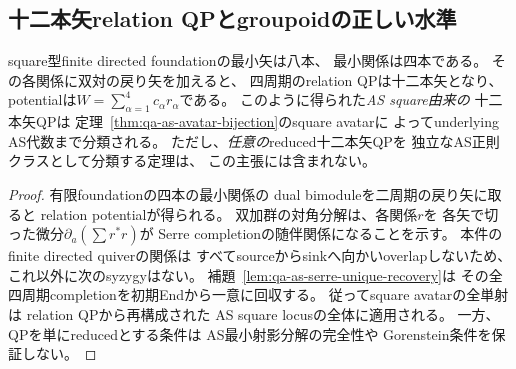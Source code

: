 \subsection{十二本矢relation QPとgroupoidの正しい水準}
\label{subsec:qa-as12-qp-status}

\begin{proposition}[十二本矢QPが表すもの]
\label{prop:qa-as12-relation-qp-status}
square型finite directed foundationの最小矢は八本、
最小関係は四本である。
その各関係に双対の戻り矢を加えると、
四周期のrelation QPは十二本矢となり、
potentialは$W=\sum_{\alpha=1}^4c_\alpha r_\alpha$である。
このように得られた\emph{AS square由来の}
十二本矢QPは
定理~\ref{thm:qa-as-avatar-bijection}のsquare avatarに
よってunderlying AS代数まで分類される。
ただし、\emph{任意の}reduced十二本矢QPを
独立なAS正則クラスとして分類する定理は、
この主張には含まれない。
\end{proposition}
\begin{proof}
有限foundationの四本の最小関係の
dual bimoduleを二周期の戻り矢に取ると
relation potentialが得られる。
双加群の対角分解は、各関係$r$を
各矢で切った微分$\partial_a(\sum r^*r)$が
Serre completionの随伴関係になることを示す。
本件のfinite directed quiverの関係は
すべてsourceからsinkへ向かいoverlapしないため、
これ以外に次のsyzygyはない。
補題~\ref{lem:qa-as-serre-unique-recovery}は
その全四周期completionを初期Endから一意に回収する。
従ってsquare avatarの全単射は
relation QPから再構成された
AS square locusの全体に適用される。
一方、QPを単にreducedとする条件は
AS最小射影分解の完全性や
Gorenstein条件を保証しない。
\end{proof}

